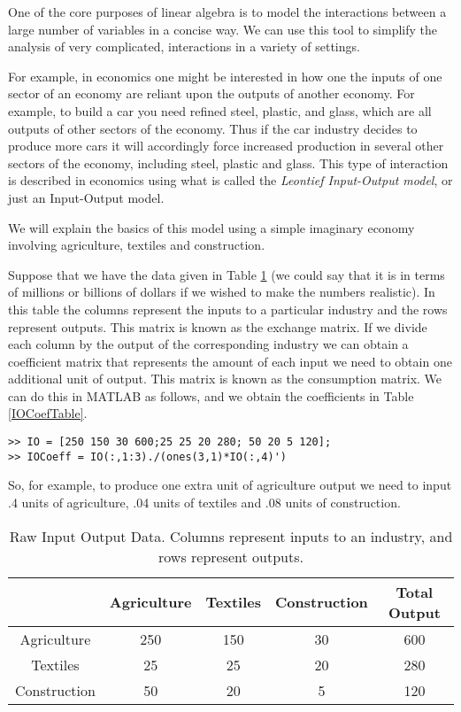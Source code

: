 \label{Leontief}


One of the core purposes of linear algebra is to model the interactions between a large number of variables in a concise way. We can use this tool to simplify the analysis of very complicated, interactions in a variety of settings.

For example, in economics one might be interested in how one the inputs of one sector of an economy are reliant upon the outputs of another economy. For example, to build a car you need refined steel, plastic, and glass, which are all outputs of other sectors of the economy. Thus if the car industry decides to produce more cars it will accordingly force increased production in several other sectors of the economy, including steel, plastic and glass. This type of interaction is described in economics using what is called the \emph{Leontief Input-Output model}, or just an Input-Output model.

We will explain the basics of this model using a simple imaginary economy involving agriculture, textiles and construction.

Suppose that we have the data given in Table \ref{IORawTable} (we could say that it is in terms of millions or billions of dollars if we wished to make the numbers realistic). In this table the columns represent the inputs to a particular industry and the rows represent outputs. This matrix is known as the exchange matrix. If we divide each column by the output of the corresponding industry we can obtain a coefficient matrix that represents the amount of each input we need to obtain one additional unit of output. This matrix is known as the consumption matrix. We can do this in MATLAB as follows, and we obtain the coefficients in Table \ref{IOCoefTable}. 

\begin{verbatim}
>> IO = [250 150 30 600;25 25 20 280; 50 20 5 120];
>> IOCoeff = IO(:,1:3)./(ones(3,1)*IO(:,4)')
\end{verbatim}

So, for example, to produce one extra unit of agriculture output we need to input .4 units of agriculture, .04 units of textiles and .08 units of construction.

\begin{table}
\begin{center}
\begin{tabular}{|c|c|c|c|c|}
\hline
& Agriculture & Textiles & Construction & Total Output \\ \hline
Agriculture & 250 & 150 & 30 & 600 \\ \hline
Textiles & 25 & 25 & 20 & 280 \\ \hline
Construction & 50 & 20 & 5 & 120 \\ \hline
\end{tabular}
\caption{Raw Input Output Data. Columns represent inputs to an industry, and rows represent outputs.}  \label{IORawTable}
\end{center}
\end{table}

